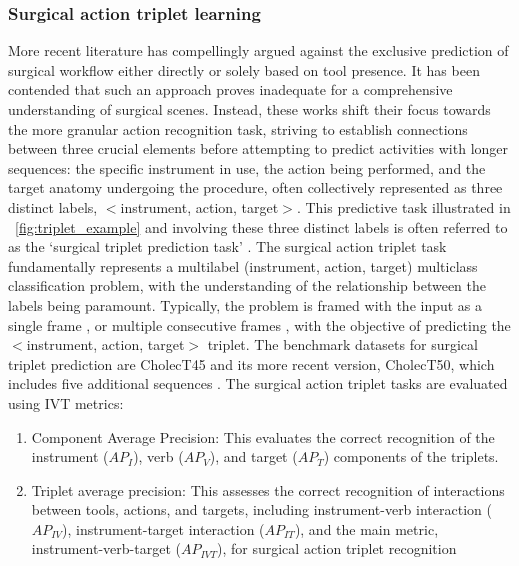\documentclass[times,twocolumn,final]{elsarticle}
\newcommand{\figref}[1]{\figurename~\ref{#1}}
\begin{document}
\subsubsection{Surgical action triplet learning}
More recent literature has compellingly argued against the exclusive prediction of surgical workflow either directly or solely based on tool presence. It has been contended that such an approach proves inadequate for a comprehensive understanding of surgical scenes. Instead, these works shift their focus towards the more granular action recognition task, striving to establish connections between three crucial elements before attempting to predict activities with longer sequences: the specific instrument in use, the action being performed, and the target anatomy undergoing the procedure, often collectively represented as three distinct labels, $<$instrument, action, target$>$.
This predictive task illustrated in \figref{fig:triplet_example} and involving these three distinct labels is often referred to as the `surgical triplet prediction task' \citep{laproscopic_rule_based_action_triplets}.
The surgical action triplet task fundamentally represents a multilabel (instrument, action, target) multiclass classification problem, with the understanding of the relationship between the labels being paramount. Typically, the problem is framed with the input as a single frame \citep{1nywoye_rec_action_triplets,NWOYE2022102433_rendevous}, or multiple consecutive frames \citep{sharma2022RendezvousInTime}, with the objective of predicting the $<$instrument, action, target$>$ triplet. 
The benchmark datasets for surgical triplet prediction are CholecT45 and its more recent version, CholecT50, which includes five additional sequences \citep{NWOYE2022102433_rendevous}. The surgical action triplet tasks are evaluated using IVT metrics:

\begin{enumerate}
    \item Component Average Precision: This evaluates the correct recognition of the instrument ($AP_I$), verb ($AP_V$), and target ($AP_T$) components of the triplets.
    \item Triplet average precision: This assesses the correct recognition of interactions between tools, actions, and targets, including instrument-verb interaction ($AP_{IV}$), instrument-target interaction ($AP_{IT}$), and the main metric, instrument-verb-target ($AP_{IVT}$), for surgical action triplet recognition
\end{enumerate}
\end{document}
